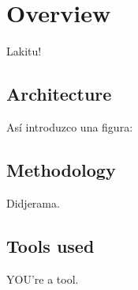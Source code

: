 \chapter{Overview}

Lakitu!



\section{Architecture}

Así introduzco una figura:



\section{Methodology}

Didjerama.

\section{Tools used}

YOU're a tool.